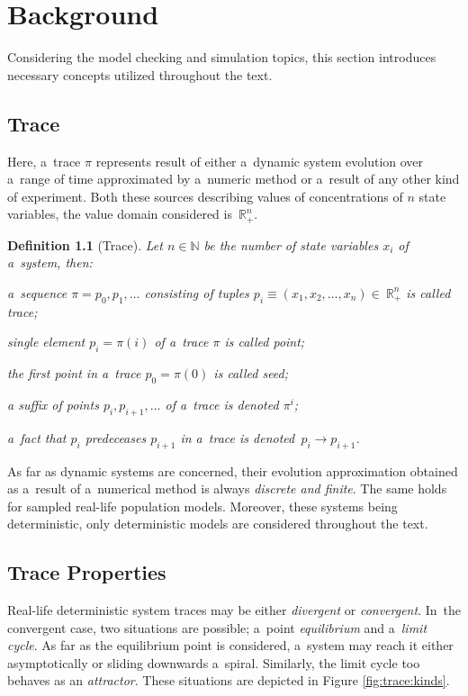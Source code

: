 \documentclass[12pt,twoside,draft]{fithesis}
\newcommand{\mReal}{\mathbb{R}}
\newcommand{\mNatural}{\mathbb{N}}
\newtheorem{mydef}{Definition}
\begin{document}
\chapter{Background}
Considering the model checking and simulation topics, this section
introduces necessary concepts utilized throughout the text.

\section{Trace}
Here, a~trace $\pi$ represents result of either a~dynamic system
evolution over a~range of time\cite{sven,pospisil} approximated by
a~numeric method or a~result of any other kind of experiment.
Both these sources describing values of concentrations of $n$ state
variables, the value domain considered is~$\mReal_{+}^n$.

\begin{mydef}[Trace]
Let $n\in\mNatural$ be the number of state variables $x_i$ of a~system,
then:
\begin{inparaenum}
\item a~sequence $\pi=p_0,p_1,\dotsc$ consisting of tuples
$p_i\equiv(x_1,x_2,\dotsc,x_n)\in~\mReal_{+}^n$ is called trace;
\item single element $p_i=\pi(i)$ of a~trace $\pi$ is called point;
\item the first point in a~trace $p_0=\pi(0)$ is called seed;
\item a suffix of points $p_i,p_{i+1},\dotsc$ of a~trace is
denoted $\pi^i$;
\item a~fact that $p_i$ predeceases $p_{i+1}$ in a~trace is
denoted~$p_i\rightarrow p_{i+1}$.
\end{inparaenum}
\end{mydef}

As far as dynamic systems are concerned, their evolution approximation
obtained as a~result of a~numerical method is always \emph{discrete and
finite}. The same holds for sampled real-life population models.
Moreover, these systems being deterministic\cite{sven}, only
deterministic models are considered throughout the text.

\section{Trace Properties}
Real-life deterministic system traces may be either \emph{divergent} or
\emph{convergent}. In~the convergent case, two situations are possible;
a~point \emph{equilibrium} and a~\emph{limit cycle}. As far as the
equilibrium point is considered, a~system may reach it either
asymptotically or sliding downwards a~spiral. Similarly, the limit
cycle too behaves as an \emph{attractor}. These situations are depicted
in Figure \ref{fig:trace:kinds}.
\end{document}

